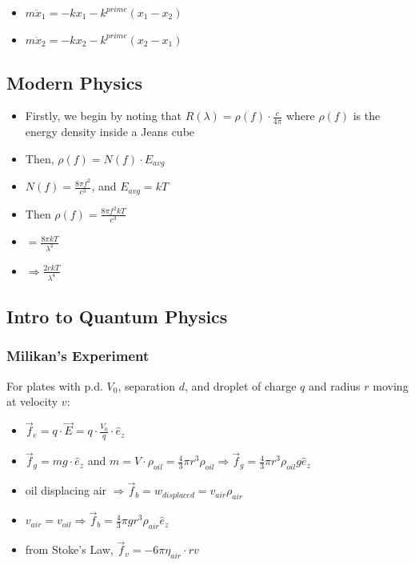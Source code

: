 \documentclass{article}
\begin{document}
\begin{itemize}
    \item \(m\ddot x_1 = -kx_1 - k^{prime}(x_1-x_2)\)
    \item \(m\ddot x_2 = -kx_2 - k^{prime}(x_2-x_1)\)
\end{itemize}

\subsection{Modern Physics}


\begin{itemize}
    \item Firstly, we begin by noting that \(R(\lambda)=\rho(f)\cdot\frac{c}{4\pi}\) where \(\rho(f)\) is the energy density inside a Jeans cube
    \item Then, \(\rho(f)=N(f)\cdot E_{avg}\) 
    \item \(N(f)=\frac{8\pi f^2}{c^3}\), and \(E_{avg} = kT\)
    \item Then \(\rho(f)=\frac{8\pi f^2kT}{c^3}\)
    \item \(=\frac{8\pi kT}{\lambda^2}\)
    \item \(\Rightarrow\boxed{\frac{2ckT}{\lambda^4}}\)
\end{itemize}


\subsection{Intro to Quantum Physics}

\subsubsection*{Milikan's Experiment}
For plates with p.d. \(V_0\), separation \(d\),
and droplet of charge \(q\) and radius \(r\) moving at velocity \(v\):

\begin{itemize}
    \item \(\vec f_e = q\cdot\vec E = q\cdot\frac{V_0}{q}\cdot\hat e_z\)
    \item \(\vec f_g = mg\cdot\hat e_z\) and \(m=V\cdot \rho_{oil}=\frac{4}{3}\pi r^3\rho_{oil}\Rightarrow \vec f_g = \frac{4}{3}\pi r^3\rho_{oil} g\hat e_z \)
    \item oil displacing air \(\Rightarrow\vec f_b = w_{displaced}=v_{air}\rho_{air}\)
    \item \(v_{air} = v_{oil}\Rightarrow\vec f_b = \frac{4}{3}\pi g r^3\rho_{air}\hat e_z\)
    \item from Stoke's Law, \(\vec f_v = -6\pi\eta_{air}\cdot rv\)
\end{itemize}
\end{document}
